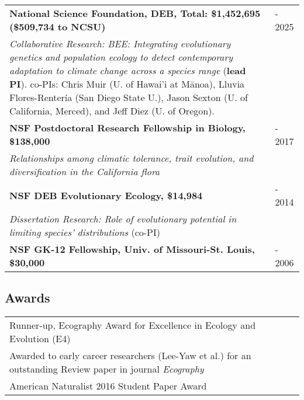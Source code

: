 \documentclass[11pt,english]{article}
\providecommand{\tabularnewline}{\\}
\begin{document}
\renewcommand{\arraystretch}{1.2}
\begin{tabularx}{\textwidth}{@{}>{\raggedright}p{5.25in} >{\raggedleft}X@{}}

\small \textbf{{National Science Foundation, DEB, Total: \$1,452,695} (\$509,734 to NCSU)} & 2022 - 2025 \tabularnewline
\addtolength{\leftskip}{5ex}\emph{Collaborative Research: BEE: Integrating evolutionary genetics and population ecology to detect contemporary adaptation to climate change across a species range} (\textbf{lead PI}). \small{co-PIs: Chris Muir (U. of Hawai'i at M\={a}noa), Lluvia Flores-Renter\'{i}a (San Diego State U.), Jason Sexton (U. of California, Merced), and Jeff Diez (U. of Oregon).} \tabularnewline

\textbf{NSF Postdoctoral Research Fellowship in Biology, \$138,000} & 2016 - 2017 \tabularnewline
\addtolength{\leftskip}{5ex}\emph{Relationships among climatic tolerance, trait evolution, and diversification in the California flora} \tabularnewline

\textbf{NSF DEB Evolutionary Ecology, \$14,984} & 2012 - 2014 \tabularnewline
\addtolength{\leftskip}{5ex}\emph{Dissertation Research: Role of evolutionary potential in limiting species' distributions} (co-PI)
\vspace{0.5ex} \tabularnewline

\textbf{NSF GK-12 Fellowship, Univ. of Missouri-St. Louis, \$30,000} & 2005 - 2006\tabularnewline
\end{tabularx}

\subsection*{Awards}
\renewcommand{\arraystretch}{1.2}
\begin{tabularx}{\textwidth}{@{}>{\raggedright}p{5.25in} >{\raggedleft}X@{}}

Runner-up, Ecography Award for Excellence in Ecology and Evolution (E4) & 2022 \tabularnewline
\addtolength{\leftskip}{5ex} Awarded to early career researchers (Lee-Yaw et al.) for an outstanding Review paper in journal \emph{Ecography} & \tabularnewline
American Naturalist 2016 Student Paper Award & 2017 \tabularnewline

\end{tabularx}
\end{document}
